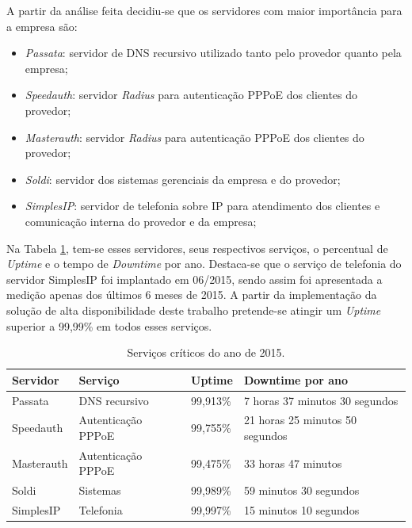 A partir da análise feita decidiu-se que os servidores com maior importância para a empresa são:
\begin{itemize}
 \item \textit{Passata}: servidor de \ac{DNS} recursivo utilizado tanto pelo provedor quanto pela empresa;
 \item \textit{Speedauth}: servidor \textit{Radius} para autenticação \ac{PPPoE} dos clientes do provedor;
 \item \textit{Masterauth}: servidor \textit{Radius} para autenticação \ac{PPPoE} dos clientes do provedor;
 \item \textit{Soldi}: servidor dos sistemas gerenciais da empresa e do provedor;
 \item \textit{SimplesIP}: servidor de telefonia sobre \ac{IP} para atendimento dos clientes e comunicação interna do provedor e da empresa;
\end{itemize}

Na Tabela \ref{tab:dispservcrit}, tem-se esses servidores, seus respectivos serviços, o percentual de \textit{Uptime} e o tempo de 
\textit{Downtime} por ano. Destaca-se que o serviço de telefonia do servidor SimplesIP foi implantado em 06/2015, sendo assim foi apresentada a 
medição apenas dos últimos 6 meses de 2015.
A partir da implementação da solução de alta disponibilidade deste trabalho pretende-se atingir um \textit{Uptime} superior a 99,99\% em
todos esses serviços.

\begin{table}[h!]
\caption{Serviços críticos do ano de 2015.}
\label{tab:dispservcrit}
\begin{center}
\begin{tabular}{|l|l|l|l|}\hline
\textbf{Servidor} & \textbf{Serviço} & \textbf{Uptime} & \textbf{Downtime por ano} \\\hline
Passata & DNS recursivo & 99,913\% & 7 horas 37 minutos 30 segundos \\\hline
Speedauth & Autenticação \ac{PPPoE} & 99,755\% & 21 horas 25 minutos 50 segundos \\\hline
Masterauth & Autenticação \ac{PPPoE} & 99,475\% & 33 horas 47 minutos \\\hline
Soldi & Sistemas & 99,989\% & 59 minutos 30 segundos \\\hline
SimplesIP & Telefonia & 99,997\% & 15 minutos 10 segundos \\\hline %
\end{tabular}
\end{center}
\end{table}


